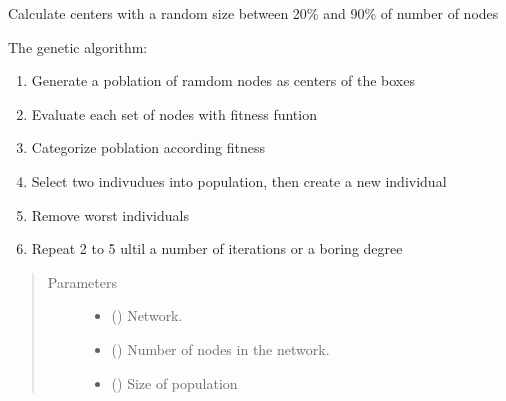 \documentclass[letterpaper,10pt,english]{sphinxmanual}
\begin{document}
\begin{fulllineitems}
\label{\detokenize{Genetic:Genetic.Genetic.calculateCenters}}
Calculate centers with a random size between 20\% and 90\% of number of nodes

The genetic algorithm:
\begin{enumerate}
\def\theenumi{\arabic{enumi}}
\def\labelenumi{\theenumi .}
\makeatletter\def\p@enumii{\p@enumi \theenumi .}\makeatother
\item {} 
Generate a poblation of ramdom nodes as centers of the boxes

\item {} 
Evaluate each set of nodes with fitness funtion

\item {} 
Categorize poblation according fitness

\item {} 
Select two indivudues into population, then create a new individual

\item {} 
Remove worst individuals

\item {} 
Repeat 2 to 5 ultil a number of iterations or a boring degree

\end{enumerate}
\begin{quote}\begin{description}
\item[{Parameters}] \leavevmode\begin{itemize}
\item {} 
 () \textendash{} Network.

\item {} 
 () \textendash{} Number of nodes in the network.

\item {} 
 () \textendash{} Size of population


\end{itemize}
\end{description}
\end{quote}
\end{fulllineitems}
\end{document}
